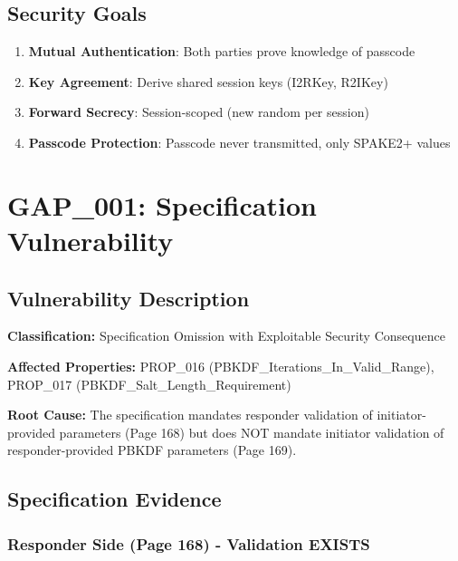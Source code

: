 \documentclass[11pt,a4paper]{article}
\begin{document}
\subsection{Security Goals}

\begin{enumerate}
    \item \textbf{Mutual Authentication}: Both parties prove knowledge of passcode
    \item \textbf{Key Agreement}: Derive shared session keys (I2RKey, R2IKey)
    \item \textbf{Forward Secrecy}: Session-scoped (new random per session)
    \item \textbf{Passcode Protection}: Passcode never transmitted, only SPAKE2+ values
\end{enumerate}

\section{GAP\_001: Specification Vulnerability}

\subsection{Vulnerability Description}

\begin{vulnerabilitybox}
\textbf{Classification:} Specification Omission with Exploitable Security Consequence

\textbf{Affected Properties:} PROP\_016 (PBKDF\_Iterations\_In\_Valid\_Range), PROP\_017 (PBKDF\_Salt\_Length\_Requirement)

\textbf{Root Cause:} The specification mandates responder validation of initiator-provided parameters (Page 168) but does NOT mandate initiator validation of responder-provided PBKDF parameters (Page 169).
\end{vulnerabilitybox}

\subsection{Specification Evidence}

\subsubsection{Responder Side (Page 168) - Validation EXISTS}
\end{document}

